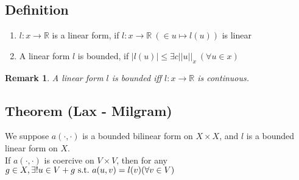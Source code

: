 \documentclass[a4paper,12pt]{article}
\newtheorem{remark}{Remark}[]
\newcommand{\R}{\mathbb{R}}
\begin{document}
\subsection{Definition}
\begin{enumerate}
	\item $l: x \rightarrow \R$ is a linear form, if $l: x \rightarrow \R\ (\in u \mapsto l(u))$ is linear
	\item A linear form $l$ is bounded, if $|l(u)| \leq \exists c||u||_x\ (\forall u \in x)$
\end{enumerate}
\begin{remark}
	A linear form $l$ is bounded iff $l: x \rightarrow \R$ is continuous.
\end{remark}
\subsection{Theorem (Lax - Milgram)}
We suppose $a(\cdot,\cdot)$ is a bounded bilinear form on $X\times X$, and $l$ is a bounded linear form on $X$.\\
If $a(\cdot,\cdot)$ is coercive on $V\times V$, then for any $g\in X,\\ \exists! u\in V+g\ \text{s.t.}\ a(u,v)=l(v)(\forall v \in V)$
\end{document}
